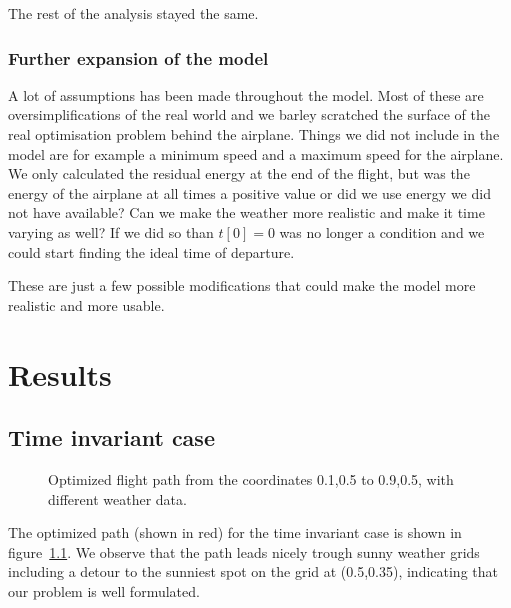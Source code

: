 \documentclass[ twoside,openright,titlepage,numbers=noenddot,headinclude,%
                footinclude=true,cleardoublepage=empty,abstractoff, %
                BCOR=5mm,paper=a4,fontsize=11pt,%
                ngerman,american,%
                ]{scrreprt}
\begin{document}
The rest of the analysis stayed the same.


\subsection{Further expansion of the model}

A lot of assumptions has been made throughout the model.
Most of these are oversimplifications of the real world and we barley scratched the surface of the real optimisation problem behind the airplane.
Things we did not include in the model are for example a minimum speed and a maximum speed for the airplane.
We only calculated the residual energy at the end of the flight, but was the energy of the airplane at all times a positive value or did we use energy we did not have available?
Can we make the weather more realistic and make it time varying as well? If we did so than $ t[0] =0 $ was no longer a condition and we could start finding the ideal time of departure.

These are just a few possible modifications that could make the model more realistic and more usable.






\chapter{Results}
\section{Time invariant case}
\begin{figure}


\caption{Optimized flight path from the coordinates 0.1,0.5 to 0.9,0.5, with different weather data.}
\label{fig:path1}

\end{figure}
The optimized path (shown in red) for the time invariant case is shown in figure~\ref{fig:path1}. We observe that the path leads nicely trough sunny weather grids including a detour to the sunniest spot on the grid at (0.5,0.35), indicating that our problem is well formulated.
\end{document}
